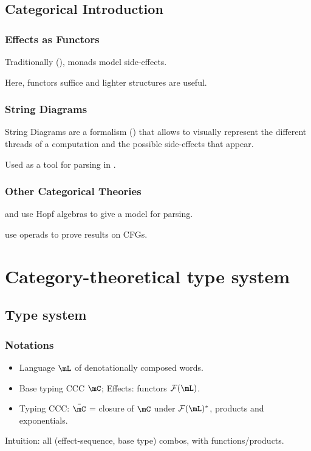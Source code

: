 \documentclass[math, english, info]{beamercours}
\begin{document}
\subsection{Categorical Introduction}
\begin{frame}
	\frametitle{Effects as Functors}
	Traditionally (\cite{moggiComputationalLambdacalculusMonads1989}), monads model side-effects.
	\pause

	Here, functors suffice and lighter structures are useful.
\end{frame}

\begin{frame}
	\frametitle{String Diagrams}
	String Diagrams are a formalism (\cite{hinzeIntroducingStringDiagrams2023})
	that allows to visually represent the different threads of a
	computation and the possible side-effects that appear.

	\pause
	Used as a tool for parsing in \cite{coeckeMathematicalFoundationsCompositional2010}.
\end{frame}

\begin{frame}
	\frametitle{Other Categorical Theories}
	\cite{marcollimatildeetchomskynoametberwickrobertc.MathematicalStructureSyntactic}
	and \cite{senturiaAlgebraicStructureMorphosyntax2025} use Hopf algebras to
	give a model for parsing.

	\medskip

	\cite{melliesCategoricalContoursChomskySchutzenberger2025} use operads to
	prove results on CFGs.
\end{frame}

\section{Category-theoretical type system}
\subsection{Type system}
\begin{frame}
	\frametitle{Notations}
	\begin{itemize}
		\item Language $\mL$ of denotationally composed words.
		\item Base typing CCC $\mC$; Effects: functors $\mathcal{F}(\mL)$.
		      \pause
		\item Typing CCC: $\bar{\mC}$ = closure of $\mC$ under $\mathcal{F}(\mL)^{*}$, products and exponentials.
	\end{itemize}
	Intuition: all (effect-sequence, base type) combos, with functions/products.
\end{frame}
\end{document}
